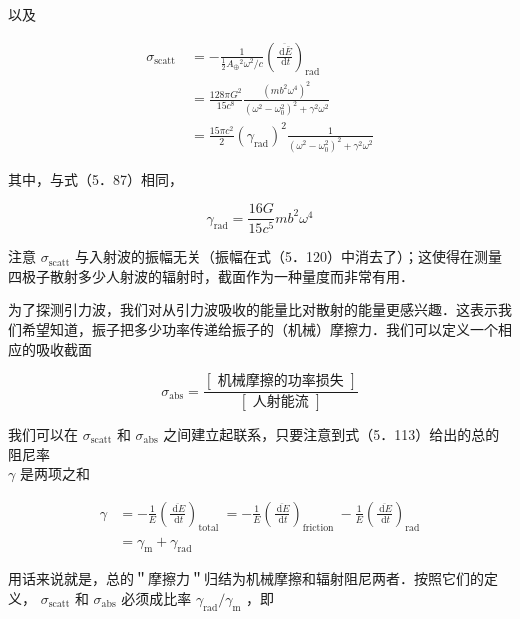 以及


\begin{align*}
	\sigma_{\text {scatt }} & =-\frac{1}{\frac{1}{2} A_{\oplus}{ }^{2} \omega^{2} / c}\left(\frac{\overline{\mathrm{~d} \bar{E}}}{\mathrm{~d} t}\right)_{\mathrm{rad}} \\
	& =\frac{128 \pi G^{2}}{15 c^{8}} \frac{\left(m b^{2} \omega^{4}\right)^{2}}{\left(\omega^{2}-\omega_{0}^{2}\right)^{2}+\gamma^{2} \omega^{2}}  \tag{5.120}\\
	& =\frac{15 \pi c^{2}}{2}\left(\gamma_{\mathrm{rad}}\right)^{2} \frac{1}{\left(\omega^{2}-\omega_{0}^{2}\right)^{2}+\gamma^{2} \omega^{2}} \tag{5.121}
\end{align*}


其中，与式（5．87）相同，


\begin{equation*}
	\gamma_{\mathrm{rad}}=\frac{16 G}{15 c^{5}} m b^{2} \omega^{4} \tag{5.122}
\end{equation*}


注意 $\sigma_{\mathrm{scatt}}$ 与入射波的振幅无关（振幅在式（5．120）中消去了）；这使得在测量四极子散射多少人射波的辐射时，截面作为一种量度而非常有用．

为了探测引力波，我们对从引力波吸收的能量比对散射的能量更感兴趣．这表示我们希望知道，振子把多少功率传递给振子的（机械）摩擦力．我们可以定义一个相应的吸收截面


\begin{equation*}
	\sigma_{\mathrm{abs}}=\frac{[\text { 机械摩擦的功率损失 }]}{[\text { 人射能流 }]} \tag{5.123}
\end{equation*}


我们可以在 $\sigma_{\mathrm{scatt}}$ 和 $\sigma_{\mathrm{abs}}$ 之间建立起联系，只要注意到式（5．113）给出的总的阻尼率\\
$\gamma$ 是两项之和


\begin{align*}
	\gamma & =-\frac{1}{E}\left(\frac{\overline{\mathrm{~d} E}}{\mathrm{~d} t}\right)_{\text {total }}=-\frac{1}{E}\left(\frac{\overline{\mathrm{~d} E}}{\mathrm{~d} t}\right)_{\text {friction }}-\frac{1}{E}\left(\frac{\overline{\mathrm{~d} E}}{\mathrm{~d} t}\right)_{\mathrm{rad}} \\
	& =\gamma_{\mathrm{m}}+\gamma_{\mathrm{rad}} \tag{5.124}
\end{align*}


用话来说就是，总的＂摩擦力＂归结为机械摩擦和辐射阻尼两者．按照它们的定义， $\sigma_{\mathrm{scatt}}$ 和 $\sigma_{\mathrm{abs}}$ 必须成比率 $\gamma_{\mathrm{rad}} / \gamma_{\mathrm{m}}$ ，即


